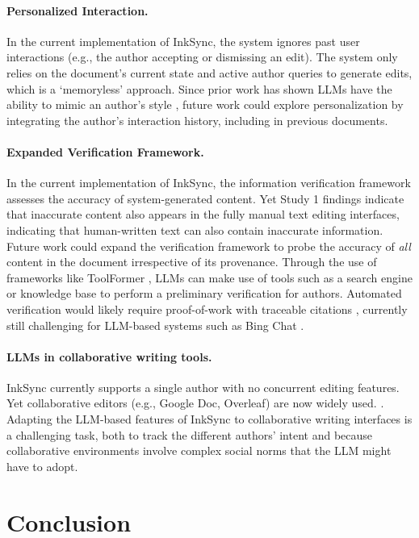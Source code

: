 \documentclass[manuscript]{acmart}
\begin{document}
\paragraph{Personalized Interaction.} In the current implementation of InkSync, the system ignores past user interactions (e.g., the author accepting or dismissing an edit). The system only relies on the document's current state and active author queries to generate edits, which is a `memoryless' approach. Since prior work has shown LLMs have the ability to mimic an author's style \cite{reif2022recipe}, future work could explore personalization by integrating the author's interaction history, including in previous documents.

\paragraph{Expanded Verification Framework.} In the current implementation of InkSync, the information verification framework assesses the accuracy of system-generated content. Yet Study 1 findings indicate that inaccurate content also appears in the fully manual text editing interfaces, indicating that human-written text can also contain inaccurate information. Future work could expand the verification framework to probe the accuracy of \textit{all} content in the document irrespective of its provenance. Through the use of frameworks like ToolFormer \cite{schick2023toolformer}, LLMs can make use of tools such as a search engine or knowledge base to perform a preliminary verification for authors. Automated verification would likely require proof-of-work with traceable citations \cite{gao2023enabling}, currently still challenging for LLM-based systems such as Bing Chat \cite{liu2023evaluating}.

\paragraph{LLMs in collaborative writing tools.} InkSync currently supports a single author with no concurrent editing features. Yet collaborative editors (e.g., Google Doc, Overleaf) are now widely used. \cite{brodahl2011collaborative}. Adapting the LLM-based features of InkSync to collaborative writing interfaces is a challenging task, both to track the different authors' intent and because collaborative environments involve complex social norms \cite{reagle2010nice, gero2023social} that the LLM might have to adopt.

\section{Conclusion} \label{sec:conclusion}
\end{document}
